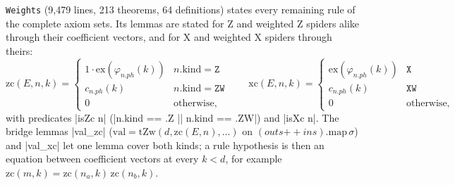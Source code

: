 \texttt{Weights} (9{,}479 lines, 213 theorems, 64 definitions) states every remaining rule of the
complete axiom sets. Its lemmas are stated for Z and weighted Z spiders alike through their
coefficient vectors, and for X and weighted X spiders through theirs:
\[
\mathrm{zc}(E,n,k)=\begin{cases}1\cdot\mathrm{ex}(\varphi_{n.ph}(k))&n.\mathrm{kind}=\mathtt Z\\
c_{n.ph}(k)&n.\mathrm{kind}=\mathtt{ZW}\\0&\text{otherwise,}\end{cases}\qquad
\mathrm{xc}(E,n,k)=\begin{cases}\mathrm{ex}(\varphi_{n.ph}(k))&\mathtt X\\c_{n.ph}(k)&\mathtt{XW}\\0&\text{otherwise,}\end{cases}
\]
with predicates \lean|isZc n| (\lean|n.kind == .Z || n.kind == .ZW|) and \lean|isXc n|. The bridge
lemmas \lean|val_zc| ($\mathrm{val}=\mathrm{tZw}(d,\mathrm{zc}(E,n),\ldots)$ on
$(outs\mathbin{+\!\!+}ins).\mathrm{map}\,\sigma$) and \lean|val_xc| let one lemma cover both kinds; a
rule hypothesis is then an equation between coefficient vectors at every $k<d$, for example
$\mathrm{zc}(m,k)=\mathrm{zc}(n_a,k)\,\mathrm{zc}(n_b,k)$.

